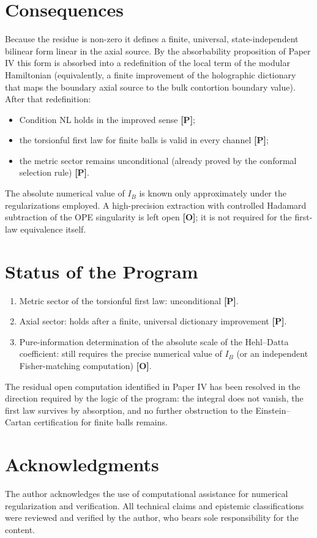 \documentclass[11pt]{article}
\newcommand{\pP}{\textbf{[P]}}
\newcommand{\pO}{\textbf{[O]}}
\begin{document}
\section{Consequences}
Because the residue is non-zero it defines a finite, universal,
state-independent bilinear form linear in the axial source. By the
absorbability proposition of Paper IV this form is absorbed into a
redefinition of the local term of the modular Hamiltonian
(equivalently, a finite improvement of the holographic dictionary that
maps the boundary axial source to the bulk contortion boundary value).
After that redefinition:
\begin{itemize}[leftmargin=1.4em]
\item Condition NL holds in the improved sense \pP{};
\item the torsionful first law for finite balls is valid in every channel \pP{};
\item the metric sector remains unconditional (already proved by the conformal
selection rule) \pP{}.
\end{itemize}
The absolute numerical value of $I_B$ is known only approximately under
the regularizations employed. A high-precision extraction with controlled
Hadamard subtraction of the OPE singularity is left open \pO{}; it is
not required for the first-law equivalence itself.

\section{Status of the Program}
\begin{enumerate}[leftmargin=1.6em]
\item Metric sector of the torsionful first law: unconditional \pP{}.
\item Axial sector: holds after a finite, universal dictionary improvement \pP{}.
\item Pure-information determination of the absolute scale of the
Hehl--Datta coefficient: still requires the precise numerical value of
$I_B$ (or an independent Fisher-matching computation) \pO{}.
\end{enumerate}
The residual open computation identified in Paper IV has been resolved
in the direction required by the logic of the program: the integral does
not vanish, the first law survives by absorption, and no further
obstruction to the Einstein--Cartan certification for finite balls
remains.

\section*{Acknowledgments}
The author acknowledges the use of computational assistance for numerical
regularization and verification. All technical claims and epistemic
classifications were reviewed and verified by the author, who bears sole
responsibility for the content.
\end{document}
